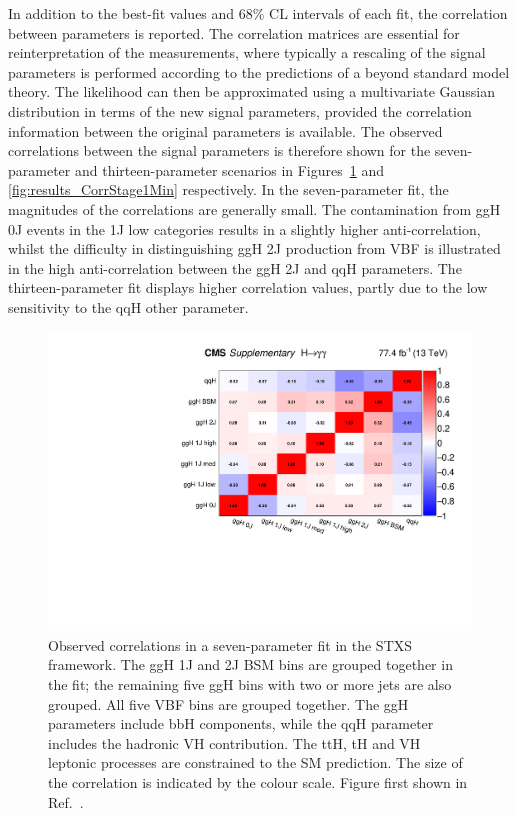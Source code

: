 In addition to the best-fit values and 68\% CL intervals of each fit, 
the correlation between parameters is reported.
The correlation matrices are essential for reinterpretation of the measurements, 
where typically a rescaling of the signal parameters is performed 
according to the predictions of a beyond standard model theory.
The likelihood can then be approximated using a multivariate Gaussian distribution 
in terms of the new signal parameters, 
provided the correlation information between the original parameters is available.
The observed correlations between the signal parameters is therefore shown for the
seven-parameter and thirteen-parameter scenarios 
in Figures~\ref{fig:results_CorrStage1} and \ref{fig:results_CorrStage1Min} respectively.
In the seven-parameter fit, the magnitudes of the correlations are generally small.
The contamination from ggH 0J events in the 1J low categories results in a slightly higher 
anti-correlation, whilst the difficulty in distinguishing ggH 2J production from VBF 
is illustrated in the high anti-correlation between the ggH 2J and qqH parameters.
The thirteen-parameter fit displays higher correlation values, 
partly due to the low sensitivity to the qqH other parameter.

\begin{figure}[hptb]
  \centering
  \includegraphics[width=\textwidth]{Figures/Results/CorrStage1.pdf}
  \caption[Observed correlations in a seven-parameter fit in the STXS framework.]
  {
    Observed correlations in a seven-parameter fit in the STXS framework. 
    The ggH 1J and 2J BSM bins are grouped together in the fit; 
    the remaining five ggH bins with two or more jets are also grouped. 
    All five VBF bins are grouped together. 
    The ggH parameters include bbH components, 
    while the qqH parameter includes the hadronic VH contribution. 
    The ttH, tH and VH leptonic processes are constrained to the SM prediction. 
    The size of the correlation is indicated by the colour scale.
    Figure first shown in Ref.~\cite{HIG-18-029}.
  }
  \label{fig:results_CorrStage1}
\end{figure}

